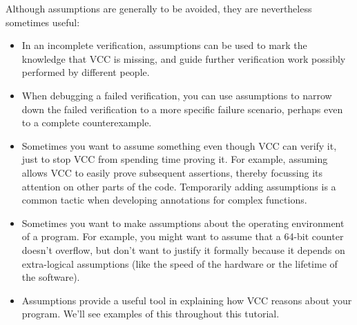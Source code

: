 Although assumptions are generally to be avoided, they are nevertheless
sometimes useful:
\begin{itemize}
\item In an incomplete verification, assumptions can be used
  to mark the knowledge that VCC is missing, and guide further verification
  work possibly performed by different people.

\item When debugging a failed verification, you can use assumptions to
  narrow down the failed verification to a more specific failure
  scenario, perhaps even to a complete counterexample. 

\item Sometimes you want to assume something even though VCC can
  verify it, just to stop VCC from spending time proving it. For
  example, assuming \vcc{\false} allows VCC to 
  easily prove subsequent assertions, thereby focussing its
  attention on other parts of the code. Temporarily adding assumptions
  is a common tactic when developing annotations for complex functions.

\item Sometimes you want to make assumptions about the operating
  environment of a program. For example, you might want to assume that
  a 64-bit counter doesn't overflow, but don't want to justify it
  formally because it depends on extra-logical assumptions (like the
  speed of the hardware or the lifetime of the software). 
\item Assumptions provide a useful tool in explaining how VCC
  reasons about your program. We'll see examples of this throughout
  this tutorial.
\end{itemize}



